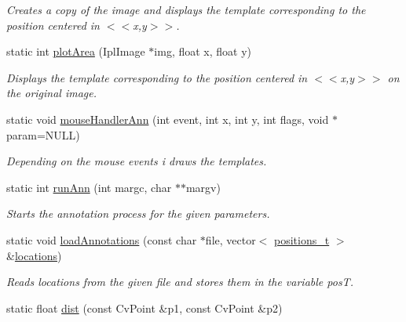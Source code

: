 \begin{DoxyCompactItemize}
\begin{DoxyCompactList}\small\item\em Creates a copy of the image and displays the template corresponding to the position centered in {\ttfamily $<$$<$x},y$>$$>$. \item\end{DoxyCompactList}\item 
\hypertarget{classAnnotatePos_afb5ac7651711a63356372656baa086ec}{
static int \hyperlink{classAnnotatePos_afb5ac7651711a63356372656baa086ec}{plotArea} (IplImage $\ast$img, float x, float y)}
\label{classAnnotatePos_afb5ac7651711a63356372656baa086ec}

\begin{DoxyCompactList}\small\item\em Displays the template corresponding to the position centered in {\ttfamily $<$$<$x},y$>$$>$ on the original image. \item\end{DoxyCompactList}\item 
static void \hyperlink{classAnnotatePos_a48dfa23a8cbe0c60c7908c63311808f4}{mouseHandlerAnn} (int event, int x, int y, int flags, void $\ast$param=NULL)
\begin{DoxyCompactList}\small\item\em Depending on the mouse events i draws the templates. \item\end{DoxyCompactList}\item 
static int \hyperlink{classAnnotatePos_a40309eea3a0545ec834f38240bd632c7}{runAnn} (int margc, char $\ast$$\ast$margv)
\begin{DoxyCompactList}\small\item\em Starts the annotation process for the given parameters. \item\end{DoxyCompactList}\item 
\hypertarget{classAnnotatePos_aecfc6c0c7763c3d98b4f0396e4bbdd9b}{
static void \hyperlink{classAnnotatePos_aecfc6c0c7763c3d98b4f0396e4bbdd9b}{loadAnnotations} (const char $\ast$file, vector$<$ \hyperlink{structpositions__t}{positions\_\-t} $>$ \&\hyperlink{classAnnotatePos_a9d4937e46b9fac69334d5fc7ea3f37a6}{locations})}
\label{classAnnotatePos_aecfc6c0c7763c3d98b4f0396e4bbdd9b}

\begin{DoxyCompactList}\small\item\em Reads locations from the given file and stores them in the variable {\ttfamily posT}. \item\end{DoxyCompactList}\item 
\hypertarget{classAnnotatePos_a540e14324f81d045bb76a1e82a592261}{
static float \hyperlink{classAnnotatePos_a540e14324f81d045bb76a1e82a592261}{dist} (const CvPoint \&p1, const CvPoint \&p2)}
\label{classAnnotatePos_a540e14324f81d045bb76a1e82a592261}


\end{DoxyCompactItemize}
